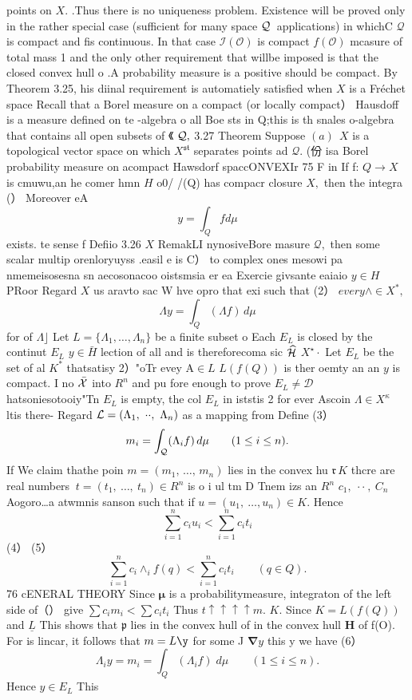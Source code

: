 points on $X.$ .Thus there is no uniqueness problem. Existence will be proved only in the rather special case (sufficient for many space ${\cal Q}\,$ applications) in whichC ${\mathcal Q}\,$ is compact and fis continuous. In that case ${\mathcal{I}}(\mathcal{O})$ is compact $f({\mathcal{O}})$ mcasure of total mass 1 and the only other requirement that willbe imposed is that the closed convex hull o .A probability measure is a positive should be compact. By Theorem 3.25, his diinal requirement is automatiely satisfied when $\textstyle X$ is a Fréchet space Recall that a Borel measure on a compact (or locally compact） Hausdoff is a measure defined on te -algebra o all Boe sts in Q;this is th snales o-algebra that contains all open subsets of 《 ${\cal Q},$ 3.27 Theorem Suppose $(a)\ \ X$ is a topological vector space on which $X^{\mathfrak{s t}}$ separates points ad ${\mathcal{Q}}.$ (份 isa Borel probability measure on acompact Hawsdorf spaccONVEXIr 75 F in If f: $Q\to X$ is cmuwu,an he comer hmn $\textstyle H$ o0/ /(Q) has compacr closure $X,$ then the integra (） Moreover eA $$ y=\int_{Q}f d\mu $$ exists. te sense f Defiio 3.26 $X$ RemakLI nynosiveBore masure ${\mathcal{Q}},$ then some scalar multip orenloryuyss .easil e is C） to complex ones mesowi pa nmemeisosesna sn aecosonacoo oistsmsia er ea Exercie givsante eaiaio $y\in H$ PRoor Regard $\textstyle{X}$ us aravto sac W hve opro that exi such that (2） $e v e r y\land\in X^{*},$ $$ \Lambda y=\int_{Q}(\Lambda f)\,d\mu $$ for of $\Lambda\rfloor$ Let $L=\{\Lambda_{1},\ldots,\Lambda_{n}\}$ be a finite subset o Each $E_{L}$ is closed by the continut $E_{L}$ $y\in{\bar{H}}$ lection of all and is thereforecoma sic $\widehat{\cal H}$ $X^{\star}\!\cdot$ Let $E_{L}$ be the set of al $\scriptstyle{K^{*}}$ thatsatisy 2）"oTr evey ${\mathrm{A}}\in L$ $L(f(Q))$ is ther oemty an an $\mathbf{}y$ is compact. I no $\textstyle{\bar{\cal X}}$ into $\textstyle R^{n}\!\!$ and pu fore enough to prove $E_{L}\neq{\mathcal{D}}$ hatsoniesotooiy"Tn $E_{L}$ is empty, the col $E_{L}$ in iststis 2 for ever Ascoin $\Lambda\in X^{\kappa}$ ltis there- Regard ${\cal L}=\left(\Lambda_{1},\ \cdot\cdot,\ \Lambda_{n}\right)$ as a mapping from Define (3） $$ m_{i}=\int_{\cal Q}(\Lambda_{i}f)\,d\mu\qquad(1\leq i\leq n). $$ If We claim thathe poin $m=(m_{1},\,\ldots,\,m_{n})$ lies in the convex hu ${\mathfrak{r}}\,K$ thcre are real numbers $\ t=(t_{1},\ \dots,\ t_{n})\in R^{n}$ is o i ul tm D Tnem izs an $\textstyle R^{n}$ $c_{1},\ \cdot\cdot\ ,\ C_{n}$ Aogoro…a atwmnis sanson such that if $u=(u_{1},\ \ldots,u_{n})\in K.$ Hence $$ \sum_{i=1}^{n}c_{i}u_{i}<\sum_{i=1}^{n}c_{i}t_{i} $$ (4） (5） $$ \sum_{i=1}^{n}c_{i}\wedge_{i}f(q)<\sum_{i=1}^{n}c_{i}t_{i}\qquad(q\in Q). $$76 cENERAL THEORY Since $\boldsymbol{\mu}$ is a probabilitymeasure, integraton of the left side of（） give $\textstyle\sum c_{i}m_{i}<\sum c_{i}t_{i}$ Thus $t\uparrow\uparrow\uparrow\uparrow m.$ $K.$ Since $K=L\left(f(Q)\right)$ and $\underline{{L}}$ This shows that ${\mathfrak{p}}$ lies in the convex hull of in the convex hull ${\boldsymbol{H}}$ of f(O). For is lincar, it follows that $m=L\y$ for some J $\mathbf{\nabla}y$ this y we have (6） $$ \Lambda_{i}y=m_{i}=\int_{Q}(\Lambda_{i}f)\;d\mu\qquad(1\leq i\leq n). $$ Hence $y\in E_{L}$ This 